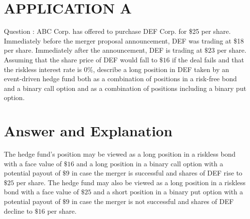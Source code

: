 \documentclass[11pt]{article}
\begin{document}
\section*{APPLICATION A}
Question : ABC Corp. has offered to purchase DEF Corp. for \$25 per share. Immediately before the merger proposal announcement, DEF was trading at \$18 per share. Immediately after the announcement, DEF is trading at $\$ 23$ per share. Assuming that the share price of DEF would fall to $\$ 16$ if the deal fails and that the riskless interest rate is 0\%, describe a long position in DEF taken by an event-driven hedge fund both as a combination of positions in a risk-free bond and a binary call option and as a combination of positions including a binary put option.

\section*{Answer and Explanation}
The hedge fund's position may be viewed as a long position in a riskless bond with a face value of $\$ 16$ and a long position in a binary call option with a potential payout of $\$ 9$ in case the merger is successful and shares of DEF rise to $\$ 25$ per share. The hedge fund may also be viewed as a long position in a riskless bond with a face value of $\$ 25$ and a short position in a binary put option with a potential payout of $\$ 9$ in case the merger is not successful and shares of DEF decline to $\$ 16$ per share.
\end{document}
